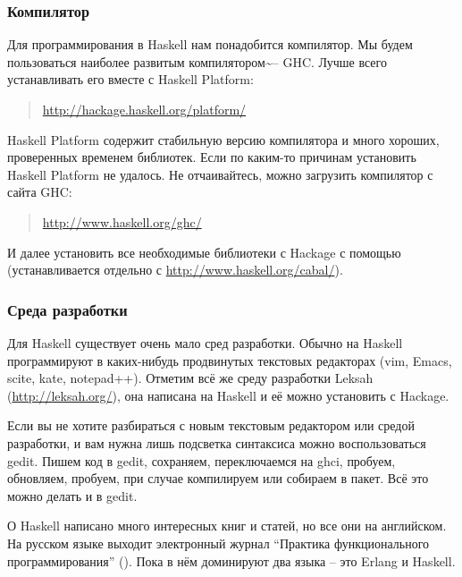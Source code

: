 
\newpage {}

\subsubsection{Компилятор}

Для программирования в Haskell нам понадобится компилятор. Мы будем
пользоваться наиболее развитым компилятором\textasciitilde{}-- GHC.
Лучше всего устанавливать его вместе с Haskell Platform:

\begin{quote}
\url{http://hackage.haskell.org/platform/}
\end{quote}

Haskell Platform содержит стабильную версию компилятора и много хороших,
проверенных временем библиотек. Если по каким-то причинам установить
Haskell Platform не удалось. Не отчаивайтесь, можно загрузить компилятор
с сайта GHC:

\begin{quote}
\url{http://www.haskell.org/ghc/}
\end{quote}

И далее установить все необходимые библиотеки с Hackage с помощью
 (устанавливается отдельно с
\url{http://www.haskell.org/cabal/}).

\subsubsection{Среда разработки}

Для Haskell существует очень мало сред разработки. Обычно на Haskell
программируют в каких-нибудь продвинутых текстовых редакторах (vim,
Emacs, scite, kate, notepad++). Отметим всё же среду разработки Leksah
(\url{http://leksah.org/}), она написана на Haskell и её можно
установить с Hackage.

Если вы не хотите разбираться с новым текстовым редактором или средой
разработки, и вам нужна лишь подсветка синтаксиса можно воспользоваться
gedit. Пишем код в gedit, сохраняем, переключаемся на ghci, пробуем,
обновляем, пробуем, при случае компилируем или собираем в пакет. Всё это
можно делать и в gedit.

\newpage {}

О Haskell написано много интересных книг и статей, но все они на
английском. На русском языке выходит электронный журнал ``Практика
функционального программирования'' (). Пока в нём доминируют два языка
-- это Erlang и Haskell.

